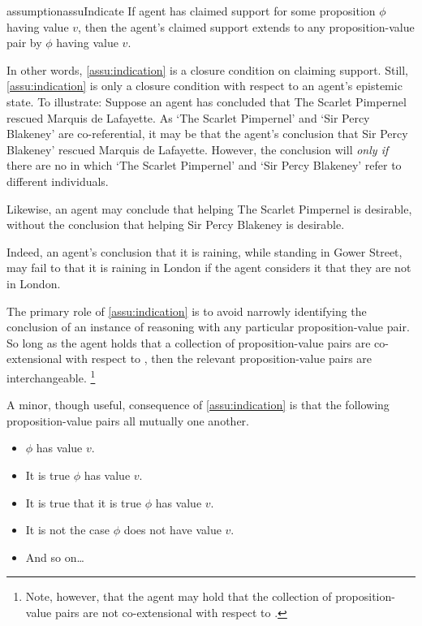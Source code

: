 \begin{note}
  \begin{restatable}[\indicateN{2}]{assumption}{assuIndicate}
    \label{assu:indication}
    If agent has claimed support for some proposition \(\phi\) having value \(v\), then the agent's claimed support extends to any proposition-value pair \indicateVed{} by \(\phi\) having value \(v\).
  \end{restatable}
\end{note}

\begin{note}
  In other words, \autoref{assu:indication} is a closure condition on claiming support.
  Still, \autoref{assu:indication} is only a closure condition with respect to an agent's epistemic state.
  To illustrate:
  Suppose an agent has concluded that The Scarlet Pimpernel rescued Marquis de Lafayette.
  As `The Scarlet Pimpernel' and `Sir Percy Blakeney' are co-referential, it may be that the agent's conclusion  that Sir Percy Blakeney' rescued Marquis de Lafayette.
  However, the conclusion will  \emph{only if} there are no  in which `The Scarlet Pimpernel' and `Sir Percy Blakeney' refer to different individuals.

  Likewise, an agent may conclude that helping The Scarlet Pimpernel is desirable, without the conclusion \indicatePr{} that helping Sir Percy Blakeney is desirable.

  Indeed, an agent's conclusion that it is raining, while standing in Gower Street, may fail to \indicateN{} that it is raining in London if the agent considers it \epPAd{} that they are not in London.
\end{note}

\begin{note}
  The primary role of \autoref{assu:indication} is to avoid narrowly identifying the conclusion of an instance of reasoning with any particular proposition-value pair.
  So long as the agent holds that a collection of proposition-value pairs are co-extensional with respect to , then the relevant proposition-value pairs are interchangeable.\nolinebreak
  \footnote{
    Note, however, that the agent may hold that the collection of proposition-value pairs are not co-extensional with respect to .
  }
\end{note}

\begin{note}
  A minor, though useful, consequence of \autoref{assu:indication} is that the following proposition-value pairs all mutually \indicateN{} one another.
  \begin{itemize}
  \item \(\phi\) has value \(v\).
  \item It is true \(\phi\) has value \(v\).
  \item It is true that it is true \(\phi\) has value \(v\).
  \item It is not the case \(\phi\) does not have value \(v\).
  \item And so on\dots
  \end{itemize}
\end{note}

